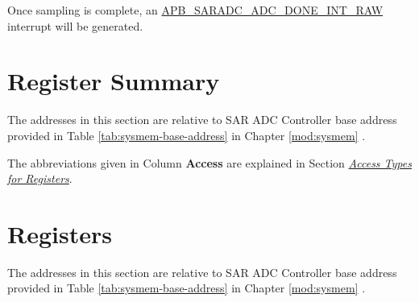 \documentclass[main\_\_EN.tex]{subfiles}
\begin{document}
Once sampling is complete, an \hyperref[fielddesc:APBSARADCDONEINTRAW]{APB\_SARADC\_ADC\_DONE\_INT\_RAW} interrupt will be generated.





\newpage
\hypertarget{sensor-reg-summ}{}
\section{Register Summary}
\label{sec:adc-reg-summ}

The addresses in this section are relative to SAR ADC Controller base address provided in Table \ref{tab:sysmem-base-address} in Chapter \ref{mod:sysmem} \textit{}.

The abbreviations given in Column \textbf{Access} are explained in Section \hyperref[glossary-access-types]{\textit{Access Types for Registers}}.







\newpage
\section{Registers}

The addresses in this section are relative to SAR ADC Controller base address provided in Table \ref{tab:sysmem-base-address} in Chapter \ref{mod:sysmem} \textit{}.


\end{document}
